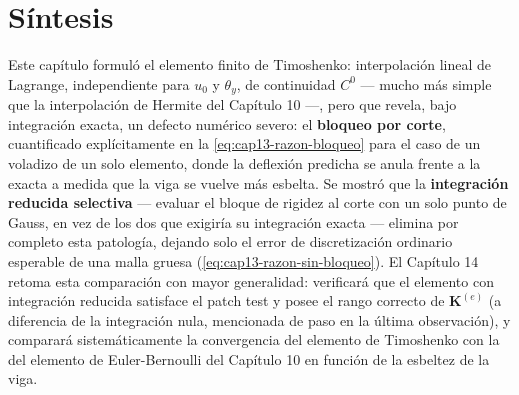 \section{Síntesis}

Este capítulo formuló el elemento finito de Timoshenko: interpolación lineal de Lagrange, independiente para $u_0$ y $\theta_y$, de continuidad $C^0$ --- mucho más simple que la interpolación de Hermite del Capítulo 10 ---, pero que revela, bajo integración exacta, un defecto numérico severo: el \textbf{bloqueo por corte}, cuantificado explícitamente en la \cref{eq:cap13-razon-bloqueo} para el caso de un voladizo de un solo elemento, donde la deflexión predicha se anula frente a la exacta a medida que la viga se vuelve más esbelta. Se mostró que la \textbf{integración reducida selectiva} --- evaluar el bloque de rigidez al corte con un solo punto de Gauss, en vez de los dos que exigiría su integración exacta --- elimina por completo esta patología, dejando solo el error de discretización ordinario esperable de una malla gruesa (\cref{eq:cap13-razon-sin-bloqueo}). El Capítulo 14 retoma esta comparación con mayor generalidad: verificará que el elemento con integración reducida satisface el patch test y posee el rango correcto de $\bm K^{(e)}$ (a diferencia de la integración nula, mencionada de paso en la última observación), y comparará sistemáticamente la convergencia del elemento de Timoshenko con la del elemento de Euler-Bernoulli del Capítulo 10 en función de la esbeltez de la viga.
